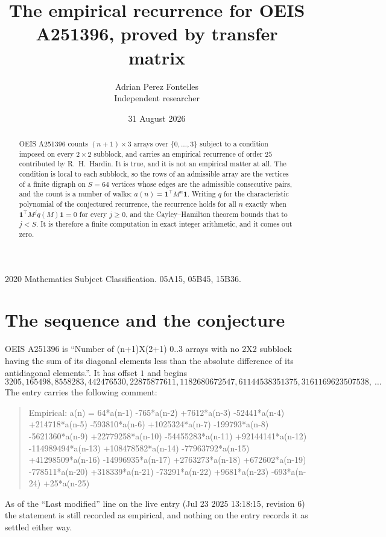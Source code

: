 \documentclass[11pt,a4paper]{article}
\title{The empirical recurrence for OEIS A251396, proved by transfer matrix}
\author{Adrian Perez Fontelles\\ \small Independent researcher}
\date{31 August 2026}
\theoremstyle{plain}
\theoremstyle{definition}
\begin{document}
\maketitle

\begin{abstract}
OEIS A251396 counts $(n+1)\times3$ arrays over $\{0,\dots,3\}$ subject to a condition imposed on
every $2\times2$ subblock, and carries an empirical recurrence of order $25$ contributed
by R.~H.~Hardin. It is true, and it is not an empirical matter at all. The condition is local
to each subblock, so the rows of an admissible array are the vertices of a finite digraph
on $S=64$ vertices whose edges are the admissible consecutive pairs, and the count is a
number of walks: $a(n)=\mathbf{1}^{\!\top}M^{n}\mathbf{1}$. Writing $q$
for the characteristic polynomial of the conjectured recurrence, the recurrence holds for all
$n$ exactly when $\mathbf{1}^{\!\top}M^{j}q(M)\mathbf{1}=0$ for every $j\ge0$, and the
Cayley--Hamilton theorem bounds that to $j<S$. It is therefore a finite computation in exact
integer arithmetic, and it comes out zero.
\end{abstract}

\noindent\small 2020 Mathematics Subject Classification. 05A15, 05B45, 15B36.\normalsize

\section{The sequence and the conjecture}

OEIS A251396 is ``Number of (n+1)X(2+1) 0..3 arrays with no 2X2 subblock having the sum of its diagonal elements less than the absolute difference of its antidiagonal elements.''. It has offset $1$ and begins
\[
3205, 165498, 8558283, 442476530, 22875877611, 1182680672547, 61144538351375, 3161169623507538,\ \dots
\]
The entry carries the following comment:
\begin{quote}\small
Empirical: a(n) = 64*a(n-1) -765*a(n-2) +7612*a(n-3) -52441*a(n-4) +214718*a(n-5) -593810*a(n-6) +1025324*a(n-7) -199793*a(n-8) -5621360*a(n-9) +22779258*a(n-10) -54455283*a(n-11) +92144141*a(n-12) -114989494*a(n-13) +108478582*a(n-14) -77963792*a(n-15) +41298509*a(n-16) -14996935*a(n-17) +2763273*a(n-18) +672602*a(n-19) -778511*a(n-20) +318339*a(n-21) -73291*a(n-22) +9681*a(n-23) -693*a(n-24) +25*a(n-25)
\end{quote}
As of the ``Last modified'' line on the live entry (Jul 23 2025 13:18:15, revision 6) the statement is
still recorded as empirical, and nothing on the entry records it as settled either way.
\end{document}
